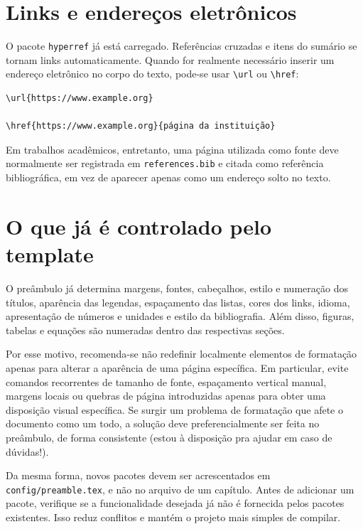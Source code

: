 \section{Links e endereços eletrônicos}
\label{sec:links}

O pacote \verb|hyperref| já está carregado. Referências cruzadas e itens do sumário se tornam links automaticamente. Quando for realmente necessário inserir um endereço eletrônico no corpo do texto, pode-se usar \verb|\url| ou \verb|\href|:

\begin{verbatim}
\url{https://www.example.org}

\href{https://www.example.org}{página da instituição}
\end{verbatim}

Em trabalhos acadêmicos, entretanto, uma página utilizada como fonte deve normalmente ser registrada em \verb|references.bib| e citada como referência bibliográfica, em vez de aparecer apenas como um endereço solto no texto.

\section{O que já é controlado pelo template}
\label{sec:controle_template}

O preâmbulo já determina margens, fontes, cabeçalhos, estilo e numeração dos títulos, aparência das legendas, espaçamento das listas, cores dos links, idioma, apresentação de números e unidades e estilo da bibliografia. Além disso, figuras, tabelas e equações são numeradas dentro das respectivas seções.

Por esse motivo, recomenda-se não redefinir localmente elementos de formatação apenas para alterar a aparência de uma página específica. Em particular, evite comandos recorrentes de tamanho de fonte, espaçamento vertical manual, margens locais ou quebras de página introduzidas apenas para obter uma disposição visual específica. Se surgir um problema de formatação que afete o documento como um todo, a solução deve preferencialmente ser feita no preâmbulo, de forma consistente (estou à disposição pra ajudar em caso de dúvidas!).

Da mesma forma, novos pacotes devem ser acrescentados em \verb|config/preamble.tex|, e não no arquivo de um capítulo. Antes de adicionar um pacote, verifique se a funcionalidade desejada já não é fornecida pelos pacotes existentes. Isso reduz conflitos e mantém o projeto mais simples de compilar.

